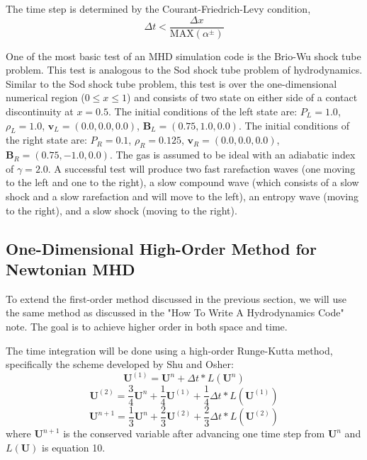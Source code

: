 \documentclass{article}
\begin{document}
The time step is determined by the Courant-Friedrich-Levy condition,
\begin{equation}
    \Delta t < \frac{\Delta x}{\text{MAX}(\alpha^{\pm})}
\end{equation}

One of the most basic test of an MHD simulation code is the  Brio-Wu shock tube problem. This test is analogous to the Sod shock tube problem of hydrodynamics. Similar to the Sod shock tube problem, this test is over the one-dimensional numerical region ($0 \leq x \leq 1$) and consists of two state on either side of a contact discontinuity at $x=0.5$. The initial conditions of the left state are: $P_L = 1.0$, $\rho_L = 1.0$, $\boldsymbol{v}_L = (0.0, 0.0, 0.0)$, $\boldsymbol{B}_L = (0.75, 1.0, 0.0)$. The initial conditions of the right state are: $P_R = 0.1$, $\rho_R = 0.125$, $\boldsymbol{v}_R = (0.0, 0.0, 0.0)$, $\boldsymbol{B}_R = (0.75, -1.0, 0.0)$. The gas is assumed to be ideal with an adiabatic index of $\gamma=2.0$. A successful test will produce two fast rarefaction waves (one moving to the left and one to the right), a slow compound wave (which consists of a slow shock and a slow rarefaction and will move to the left), an entropy wave (moving to the right), and a slow shock (moving to the right).
\vspace{6mm}
\begin{center}
    \subsection{One-Dimensional High-Order Method for Newtonian MHD}\label{S4}
\end{center}
To extend the first-order method discussed in the previous section, we will use the same method as discussed in the "How To Write A Hydrodynamics Code" note. The goal is to achieve higher order in both space and time.

The time integration will be done using a high-order Runge-Kutta method, specifically the scheme developed by Shu and Osher:
\begin{equation}
    \boldsymbol{U}^{(1)} = \boldsymbol{U}^n + \Delta t * L(\boldsymbol{U}^n)
\end{equation}
\begin{equation}
    \boldsymbol{U}^{(2)} = \frac{3}{4}\boldsymbol{U}^n + \frac{1}{4}\boldsymbol{U}^{(1)} + \frac{1}{4} \Delta t*L(\boldsymbol{U}^{(1)}) 
\end{equation}
\begin{equation}
    \boldsymbol{U}^{n+1} = \frac{1}{3}\boldsymbol{U}^n + \frac{2}{3}\boldsymbol{U}^{(2)} + \frac{2}{3} \Delta t*L(\boldsymbol{U}^{(2)}) 
\end{equation}
where $\boldsymbol{U}^{n+1}$ is the conserved variable after advancing one time step from $\boldsymbol{U}^n$ and $L(\boldsymbol{U})$ is equation 10.
\end{document}
